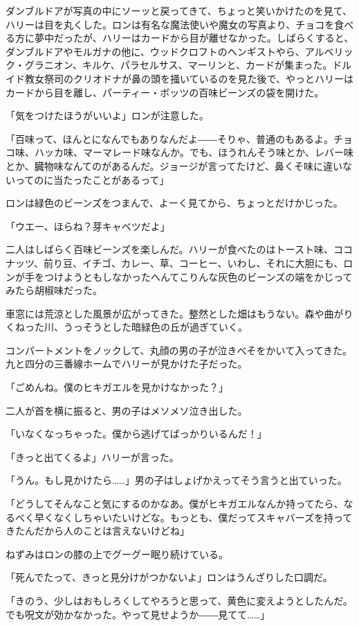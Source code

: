 \documentclass[10pt,a4paper]{article}
\begin{document}
\begin{CJK}{UTF8}{min}
ダンブルドアが写真の中にソーッと戻ってきて、ちょっと笑いかけたのを見て、ハリーは目を丸くした。ロンは有名な魔法使いや魔女の写真より、チョコを食べる方に夢中だったが、ハリーはカードから目が離せなかった。しばらくすると、ダンブルドアやモルガナの他に、ウッドクロフトのヘンギストやら、アルベリック・グラニオン、キルケ、パラセルサス、マーリンと、カードが集まった。ドルイド教女祭司のクリオドナが鼻の頭を掻いているのを見た後で、やっとハリーはカードから目を離し、パーティー・ボッツの百味ビーンズの袋を開けた。

「気をつけたほうがいいよ」ロンが注意した。

「百味って、ほんとになんでもありなんだよ――そりゃ、普通のもあるよ。チョコ味、ハッカ味、マーマレード味なんか。でも、ほうれんそう味とか、レバー味とか、臓物味なんてのがあるんだ。ジョージが言ってたけど、鼻くそ味に違いないってのに当たったことがあるって」

ロンは緑色のビーンズをつまんで、よーく見てから、ちょっとだけかじった。

「ウエー、ほらね？芽キャベツだよ」

二人はしばらく百味ビーンズを楽しんだ。ハリーが食べたのはトースト味、ココナッツ、前り豆、イチゴ、カレー、草、コーヒー、いわし、それに大胆にも、ロンが手をつけようともしなかったへんてこりんな灰色のビーンズの端をかじってみたら胡椒味だった。

車窓には荒涼とした風景が広がってきた。整然とした畑はもうない。森や曲がりくねった川、うっそうとした暗緑色の丘が過ぎていく。

コンパートメントをノックして、丸顔の男の子が泣きべそをかいて入ってきた。九と四分の三番線ホームでハリーが見かけた子だった。

「ごめんね。僕のヒキガエルを見かけなかった？」

二人が首を横に振ると、男の子はメソメソ泣き出した。

「いなくなっちゃった。僕から逃げてばっかりいるんだ！」

「きっと出てくるよ」ハリーが言った。

「うん。もし見かけたら……」男の子はしょげかえってそう言うと出ていった。

「どうしてそんなこと気にするのかなあ。僕がヒキガエルなんか持ってたら、なるべく早くなくしちゃいたいけどな。もっとも、僕だってスキャバーズを持ってきたんだから人のことは言えないけどね」

ねずみはロンの膝の上でグーグー眠り続けている。

「死んでたって、きっと見分けがつかないよ」ロンはうんざりした口調だ。

「きのう、少しはおもしろくしてやろうと思って、黄色に変えようとしたんだ。でも呪文が効かなかった。やって見せようか――見てて……」


\end{CJK}
\end{document}
